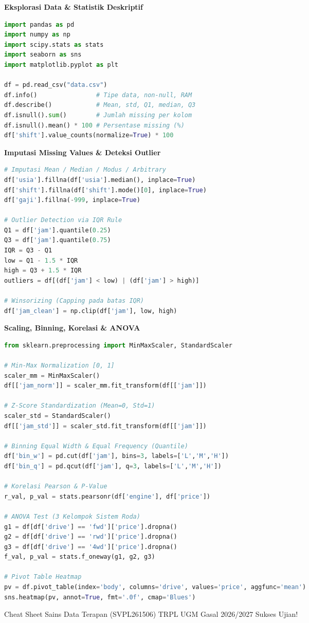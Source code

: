 \documentclass[6.8pt,landscape,a4paper]{extarticle}
\newcommand{\sdtSub}[1]{%
    \vspace{0.5pt}%
    \noindent\textbf{\fontsize{5.8pt}{6.8pt}\selectfont\color{sdtBlue}#1}\vspace{0.1pt}%
}
\begin{document}
\begin{multicols}{3}
\sdtSub{Eksplorasi Data \& Statistik Deskriptif}
\begin{lstlisting}[language=Python]
import pandas as pd
import numpy as np
import scipy.stats as stats
import seaborn as sns
import matplotlib.pyplot as plt

df = pd.read_csv("data.csv")
df.info()                # Tipe data, non-null, RAM
df.describe()            # Mean, std, Q1, median, Q3
df.isnull().sum()        # Jumlah missing per kolom
df.isnull().mean() * 100 # Persentase missing (%)
df['shift'].value_counts(normalize=True) * 100
\end{lstlisting}

\sdtSub{Imputasi Missing Values \& Deteksi Outlier}
\begin{lstlisting}[language=Python]
# Imputasi Mean / Median / Modus / Arbitrary
df['usia'].fillna(df['usia'].median(), inplace=True)
df['shift'].fillna(df['shift'].mode()[0], inplace=True)
df['gaji'].fillna(-999, inplace=True)

# Outlier Detection via IQR Rule
Q1 = df['jam'].quantile(0.25)
Q3 = df['jam'].quantile(0.75)
IQR = Q3 - Q1
low = Q1 - 1.5 * IQR
high = Q3 + 1.5 * IQR
outliers = df[(df['jam'] < low) | (df['jam'] > high)]

# Winsorizing (Capping pada batas IQR)
df['jam_clean'] = np.clip(df['jam'], low, high)
\end{lstlisting}

\sdtSub{Scaling, Binning, Korelasi \& ANOVA}
\begin{lstlisting}[language=Python]
from sklearn.preprocessing import MinMaxScaler, StandardScaler

# Min-Max Normalization [0, 1]
scaler_mm = MinMaxScaler()
df[['jam_norm']] = scaler_mm.fit_transform(df[['jam']])

# Z-Score Standardization (Mean=0, Std=1)
scaler_std = StandardScaler()
df[['jam_std']] = scaler_std.fit_transform(df[['jam']])

# Binning Equal Width & Equal Frequency (Quantile)
df['bin_w'] = pd.cut(df['jam'], bins=3, labels=['L','M','H'])
df['bin_q'] = pd.qcut(df['jam'], q=3, labels=['L','M','H'])

# Korelasi Pearson & P-Value
r_val, p_val = stats.pearsonr(df['engine'], df['price'])

# ANOVA Test (3 Kelompok Sistem Roda)
g1 = df[df['drive'] == 'fwd']['price'].dropna()
g2 = df[df['drive'] == 'rwd']['price'].dropna()
g3 = df[df['drive'] == '4wd']['price'].dropna()
f_val, p_val = stats.f_oneway(g1, g2, g3)

# Pivot Table Heatmap
pv = df.pivot_table(index='body', columns='drive', values='price', aggfunc='mean')
sns.heatmap(pv, annot=True, fmt='.0f', cmap='Blues')
\end{lstlisting}

\vfill
\begin{center}
{\fontsize{4.8pt}{5.8pt}\selectfont\textcolor{sdtDarkGray}{%
Cheat Sheet Sains Data Terapan (SVPL261506) \textbar{} TRPL UGM Gasal 2026/2027 \textbar{} Sukses Ujian!%
}}
\end{center}

\end{multicols}
\end{document}
